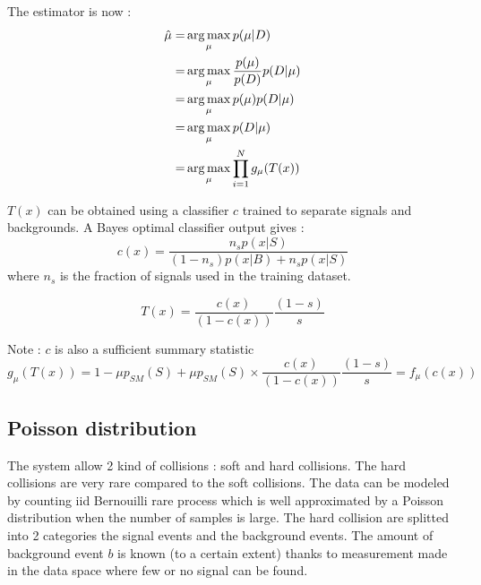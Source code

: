 The estimator is now :
\begin{align}
	\hat\mu =& \operatorname*{arg\,max}_\mu p(\mu | D) \\
	     =& \operatorname*{arg\,max}_\mu \frac{p(\mu)}{p(D)} p(D | \mu) \\
	     =& \operatorname*{arg\,max}_\mu p(\mu) p(D | \mu) \\
	     =& \operatorname*{arg\,max}_\mu  p(D | \mu) \\
	     =& \operatorname*{arg\,max}_\mu  \prod_{i=1}^N g_\mu(T(x)) \\
\end{align}


$T(x)$ can be obtained using a classifier $c$ trained to separate signals and backgrounds.
A Bayes optimal classifier output gives :
\begin{equation}
	c(x) = \frac{n_s p(x|S)}{(1-n_s) p(x|B) + n_s p(x|S)}
\end{equation}
where $n_s$ is the fraction of signals used in the training dataset.

\begin{equation}
	T(x) = \frac{c(x)}{(1-c(x))} \frac{(1-s)}{s} 
\end{equation}


Note : $c$ is also a sufficient summary statistic
\begin{equation}
	g_\mu(T(x)) = 1 - \mu p_{SM}(S) + \mu p_{SM}(S) \times \frac{c(x)}{(1-c(x))} \frac{(1-s)}{s} = f_\mu(c(x))
\end{equation}







\subsection{Poisson distribution} %
\label{sub:poisson_distribution}

The system allow 2 kind of collisions : soft and hard collisions.
The hard collisions are very rare compared to the soft collisions.
The data can be modeled by counting iid Bernouilli rare process which is well approximated by a Poisson distribution \needcite when the number of samples is large.
The hard collision are splitted into 2 categories the signal events and the background events.
The amount of background event $b$ is known (to a certain extent) thanks to measurement made in the data space where few or no signal can be found.

